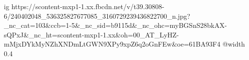  
 
 
 
 

\ifcmt
  ig https://scontent-mxp1-1.xx.fbcdn.net/v/t39.30808-6/240402048_536325827677085_3160729239436822700_n.jpg?_nc_cat=103&ccb=1-5&_nc_sid=b9115d&_nc_ohc=myBGSnS28bkAX-sQPxJ&_nc_ht=scontent-mxp1-1.xx&oh=00_AT_LyHZ-mMjxDYkMyNZhXNDmLtGWN9XPy9xpZ6q2oGnFEw&oe=61BA93F4
  @width 0.4
\fi
